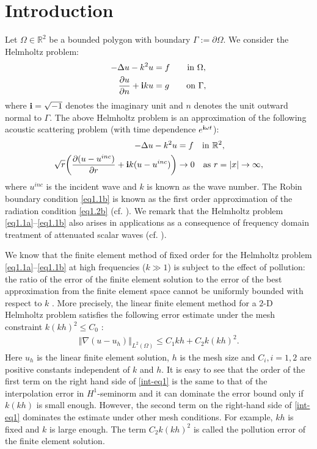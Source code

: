\documentclass[leqno,final]{siamltex}
\numberwithin{equation}{section}
\newcommand{\norm}[1]{\left\Vert#1\right\Vert}
\newcommand{\abs}[1]{\left\vert#1\right\vert}
\newcommand{\R}{\mathbb{R}}
\newcommand{\De}{\Delta}
\newcommand{\Ga}{\Gamma}
\newcommand{\na}{\nabla}
\newcommand{\om}{\omega}
\newcommand{\Om}{\Omega}
\newcommand{\pa}{\partial}
\renewcommand{\i}{{\rm\mathbf i}}
\newcommand{\eq}[1]{\begin{align}#1\end{align}}
\begin{document}
\section{Introduction}\label{intro}
Let $\Om\in\R^2$ be a bounded polygon with boundary $\Ga:=\pa\Om$. We consider the Helmholtz problem:
\eq{
-\De u - k^2 u &=f  \qquad\mbox{in  } \Om,\label{eq1.1a}\\
\frac{\pa u}{\pa n} +\i k u &=g \qquad\mbox{on } \Ga,\label{eq1.1b}
}
where $\i=\sqrt{-1}$ denotes the imaginary unit and $n$ denotes the unit outward normal to $\Ga$.
The above Helmholtz problem is an approximation of the
following acoustic scattering problem (with time dependence $e^{\i\om t}$):
\eq{ -\De u-k^2u &= f \quad \mathrm{in}\ \R^2,\label{eq1.2a}\\
\sqrt{r}\bigg(\frac{\pa(u-u^{inc})}{\pa r}+\i k(u-u^{inc})\bigg)&\rightarrow0 \quad \mathrm{as}\ r=\abs{x}\rightarrow\infty, \label{eq1.2b}   }
where $u^{inc}$ is the incident wave and $k$ is known as the wave number. The Robin boundary condition
\eqref{eq1.1b} is known as the first order approximation of the radiation condition \eqref{eq1.2b} (cf. \cite{em79}).
We remark that the Helmholtz problem \eqref{eq1.1a}--\eqref{eq1.1b} also arises in applications as a consequence of frequency domain
treatment of attenuated scalar waves (cf. \cite{dss94}).

We know that the finite element method of fixed order for the Helmholtz
problem \eqref{eq1.1a}--\eqref{eq1.1b} at high frequencies ($k\gg1$) is subject to the effect of pollution:
the ratio of the error of the finite element solution to the error of the best approximation
from the finite element space cannot be uniformly bounded with respect to $k$
\cite{Ainsworth04,bs00,bips95,dbb99,harari97,ib95a,ib97}.
More precisely, the linear finite element method for a $2$-D Helmholtz problem
satisfies the following error estimate under the mesh constraint $k(kh)^2\leq C_0$ \cite{zw,dw}:
\eq{ \norm{\na(u-u_h)}_{L^2(\Om)} \leq C_1kh+C_2k(kh)^2. \label{int-eq1}}
Here $u_h$ is the linear finite element solution, $h$ is the mesh size and $C_i,i=1,2$ are positive constants independent of $k$ and $h$.
It is easy to see that the order of the first term on the right hand side of \eqref{int-eq1} is the same to that
of the interpolation error in $H^1$-seminorm and it can dominate the error bound only if $k(kh)$ is small
enough. However, the second term on the {right-hand side} of \eqref{int-eq1} dominates the estimate under other mesh conditions.
For example, $kh$ is fixed and $k$ is large enough. The term $C_2k(kh)^2$ is called the pollution error of
the finite element solution.
\end{document}
